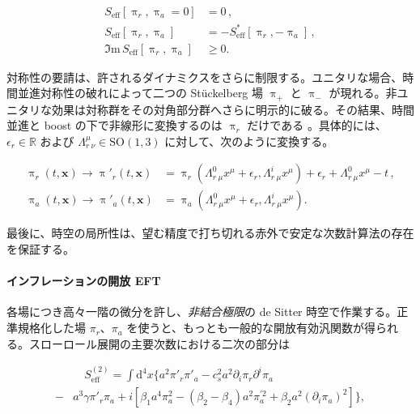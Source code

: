 \documentclass[a4paper,11pt]{ltjsarticle}
\numberwithin{equation}{section}
\def\pia{\pi_{a}}
\def\pir{\pi_{r}}
\newcommand{\dd}{\mathrm{d}}
\newcommand{\boldmathsymbol}[1]{{\ensuremath{\boldsymbol{#1}}}}
\newcommand{\bmx}{\boldmathsymbol{x}}
\newcommand{\Ima}{\Im \mathrm{m}\,}
\def\bmx{{\boldsymbol{x}}}
\begin{document}
\begin{align}
S_{\mathrm{eff}} \left[\uppi_r,\uppi_a = 0\right] &= 0\,, \label{eq:normintro} \\
S_{\mathrm{eff}} \left[\uppi_r,\uppi_a\right] &= - 	S^*_{\mathrm{eff}} \left[\uppi_r,-\uppi_a\right]\,, \label{eq:hermintro} \\
\Ima S_{\mathrm{eff}} \left[\uppi_r,\uppi_a\right] &\geq 0. \label{eq:posintro}
\end{align}

対称性の要請は、許されるダイナミクスをさらに制限する。ユニタリな場合、時間並進対称性の破れによって二つの Stückelberg 場 $\uppi_+$ と $\uppi_-$ が現れる。非ユニタリな効果は対称群をその対角部分群へさらに明示的に破る。その結果、時間並進と boost の下で非線形に変換するのは $\uppi_r$ だけである \cite{Hongo:2018ant,Akyuz:2023lsm}。具体的には、$\epsilon_r\in\mathbb{R}$ および $\Lambda^\mu_{r~\nu}\in\mathrm{SO}(1,3)$ に対して、次のように変換する。

\begin{align}\label{eq:LorentzRsymintro}
\uppi_{r}(t,\bmx) \rightarrow \uppi'_{r}(t,\bmx) &= \uppi_{r}\left(\Lambda^0_{r~\mu}x^\mu+\epsilon_{r},\Lambda^i_{r~\mu}x^\mu \right)+\epsilon_{r}+\Lambda^0_{r~\mu}x^\mu - t\,, \\
\uppi_{a}(t,\bmx) \rightarrow \uppi'_{a}(t,\bmx) &= \uppi_{a}\left(\Lambda^0_{r~\mu}x^\mu+\epsilon_{r},\Lambda^i_{r~\mu}x^\mu \right).
\end{align}

最後に、時空の局所性は、望む精度で打ち切れる赤外で安定な次数計算法の存在を保証する。

\paragraph{インフレーションの開放 EFT} 各場につき高々一階の微分を許し、\textit{非結合極限}の de Sitter 時空で作業する。正準規格化した場 $\pir$、$\pia$ を使うと、もっとも一般的な開放有効汎関数が得られる。スローロール展開の主要次数における二次の部分は

\begin{align}\label{eq:canonormintro} 
&\quad S_{\mathrm{eff}}^{(2)} = \int \dd^4 x \Big\{ a^2 \pi'_{r} \pi'_{a} - c_{s}^{2} a^2 \partial_i \pir  \partial^i \pia  \\
-&  a^3 \gamma \pi'_{r} \pia + i \left[\beta_{1} a^4 \pia^2 - \left(\beta_2 - \beta_4\right) a^2\pia^{\prime 2} + \beta_2 a^2 \left(\partial_i \pia \right)^2\right] \Big\}, \nonumber
\end{align}
\end{document}
